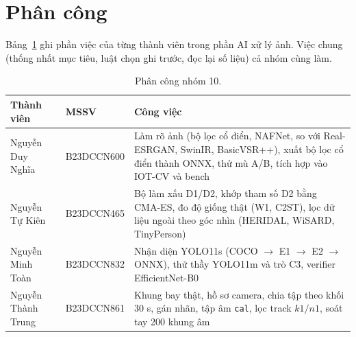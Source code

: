 \section{Phân công}\label{sec:phan-cong}

Bảng~\ref{tab:phancong} ghi phần việc của từng thành viên trong phần AI xử lý ảnh. Việc chung (thống nhất mục tiêu, luật chọn ghi trước, đọc lại số liệu) cả nhóm cùng làm.

\begin{table}[!htbp]
\centering\footnotesize
\caption{Phân công nhóm 10.}
\label{tab:phancong}
\begin{tabularx}{\textwidth}{@{}>{\raggedright\arraybackslash}p{3.3cm} l X@{}}
\toprule
Thành viên & MSSV & Công việc \\
\midrule
Nguyễn Duy Nghĩa & B23DCCN600 & Làm rõ ảnh (bộ lọc cổ điển, NAFNet, so với Real-ESRGAN, SwinIR, BasicVSR++), xuất bộ lọc cổ điển thành ONNX, thử mù A/B, tích hợp vào IOT-CV và bench \\
\addlinespace
Nguyễn Tự Kiên & B23DCCN465 & Bộ làm xấu D1/D2, khớp tham số D2 bằng CMA-ES, đo độ giống thật (W1, C2ST), lọc dữ liệu ngoài theo góc nhìn (HERIDAL, WiSARD, TinyPerson) \\
\addlinespace
Nguyễn Minh Toàn & B23DCCN832 & Nhận diện YOLO11s (COCO $\to$ E1 $\to$ E2 $\to$ ONNX), thử thầy YOLO11m và trò C3, verifier EfficientNet-B0 \\
\addlinespace
Nguyễn Thành Trung & B23DCCN861 & Khung bay thật, hồ sơ camera, chia tập theo khối 30 s, gán nhãn, tập âm \texttt{cal}, lọc track $k1/n1$, soát tay 200 khung âm \\
\bottomrule
\end{tabularx}
\end{table}
